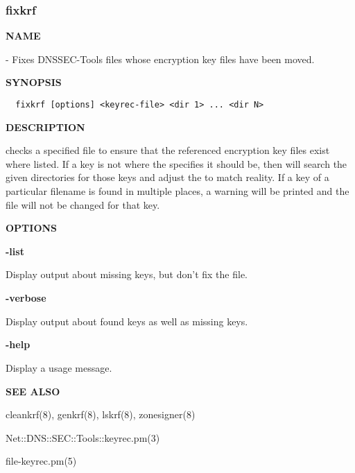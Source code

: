 \clearpage

\subsubsection{fixkrf}

{\bf NAME}

 - Fixes DNSSEC-Tools  files whose encryption key
files have been moved.

{\bf SYNOPSIS}

\begin{verbatim}
  fixkrf [options] <keyrec-file> <dir 1> ... <dir N>
\end{verbatim}

{\bf DESCRIPTION}

 checks a specified  file to ensure that the
referenced encryption key files exist where listed.  If a key is not where
the  specifies it should be, then  will search the
given directories for those keys and adjust the  to match
reality.  If a key of a particular filename is found in multiple places, a
warning will be printed and the  file will not be changed for
that key.

{\bf OPTIONS}

\begin{description}

\item {\bf -list}\verb" "

Display output about missing keys, but don't fix the  file.

\item {\bf -verbose}\verb" "

Display output about found keys as well as missing keys.

\item {\bf -help}\verb" "

Display a usage message.

\end{description}

{\bf SEE ALSO}

cleankrf(8),
genkrf(8),
lskrf(8),
zonesigner(8)

Net::DNS::SEC::Tools::keyrec.pm(3)

file-keyrec.pm(5)

